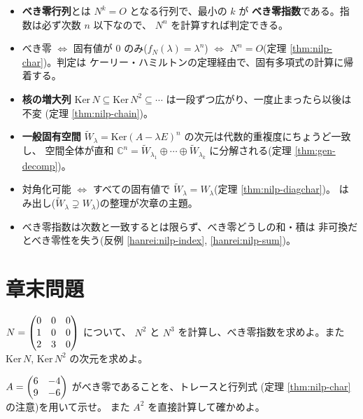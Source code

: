 \begin{matome}
\begin{itemize}
\item \textbf{べき零行列}とは $N^k = O$ となる行列で、最小の $k$ が
\textbf{べき零指数}である。指数は必ず次数 $n$ 以下なので、
$N^n$ を計算すれば判定できる。
\item べき零 $\iff$ 固有値が $0$ のみ($f_N(\lambda) = \lambda^n$)
$\iff$ $N^n = O$(定理 \ref{thm:nilp-char})。判定は
ケーリー・ハミルトンの定理経由で、固有多項式の計算に帰着する。
\item \textbf{核の増大列} $\mathrm{Ker}\,N \subseteq \mathrm{Ker}\,N^2
\subseteq \cdots$ は一段ずつ広がり、一度止まったら以後は不変
(定理 \ref{thm:nilp-chain})。
\item \textbf{一般固有空間} $\widetilde{W}_\lambda
= \mathrm{Ker}(A - \lambda E)^n$ の次元は代数的重複度にちょうど一致し、
空間全体が直和 $\mathbb{C}^n = \widetilde{W}_{\lambda_1} \oplus \cdots
\oplus \widetilde{W}_{\lambda_k}$ に分解される(定理 \ref{thm:gen-decomp})。
\item 対角化可能 $\iff$ すべての固有値で
$\widetilde{W}_\lambda = W_\lambda$(定理 \ref{thm:nilp-diagchar})。
はみ出し($\widetilde{W}_\lambda \supsetneq W_\lambda$)の整理が次章の主題。
\item べき零指数は次数と一致するとは限らず、べき零どうしの和・積は
非可換だとべき零性を失う(反例 \ref{hanrei:nilp-index},
\ref{hanrei:nilp-sum})。
\end{itemize}
\end{matome}

\section*{章末問題}

\begin{mondai}[基本]\label{q:nilp-ex1}
$N = \begin{pmatrix}0 & 0 & 0 \\ 1 & 0 & 0 \\ 2 & 3 & 0\end{pmatrix}$ について、
$N^2$ と $N^3$ を計算し、べき零指数を求めよ。また
$\mathrm{Ker}\,N$, $\mathrm{Ker}\,N^2$ の次元を求めよ。
\end{mondai}

\begin{mondai}[基本]\label{q:nilp-ex2}
$A = \begin{pmatrix}6 & -4 \\ 9 & -6\end{pmatrix}$ がべき零であることを、トレースと行列式
(定理 \ref{thm:nilp-char} の注意)を用いて示せ。
また $A^2$ を直接計算して確かめよ。
\end{mondai}

